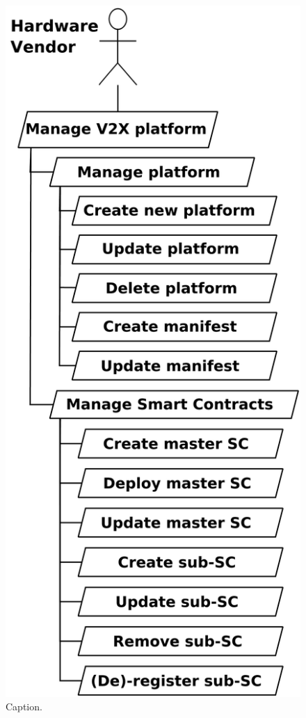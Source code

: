 \documentclass{llncs}
\begin{document}
{				\begin{figure}[H]
					\centering
					\includegraphics[scale=0.175]{Figures/aom/20180501_goal-model--refined-1.pdf}
					\caption{Caption.}	
					\label{fig:refined-aom-goal-model-1}
				\end{figure}
				
}
\end{document}

